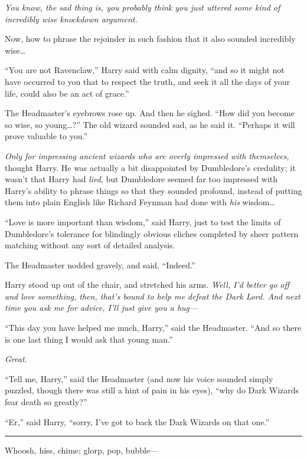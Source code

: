 \emph{You know, the sad thing is, you probably think you just uttered
some kind of incredibly wise knockdown argument.}

Now, how to phrase the rejoinder in such fashion that it also sounded
incredibly wise\ldots{}

``You are not Ravenclaw,'' Harry said with calm dignity, ``and so it
might not have occurred to you that to respect the truth, and seek it
all the days of your life, could also be an act of grace.''

The Headmaster's eyebrows rose up. And then he sighed. ``How did you
become so wise, so young\ldots{}?'' The old wizard sounded sad, as he
said it. ``Perhaps it will prove valuable to you.''

\emph{Only for impressing ancient wizards who are overly impressed with
themselves,} thought Harry. He was actually a bit disappointed by
Dumbledore's credulity; it wasn't that Harry had \emph{lied}, but
Dumbledore seemed far too impressed with Harry's ability to phrase
things so that they sounded profound, instead of putting them into plain
English like Richard Feynman had done with \emph{his} wisdom\ldots{}

``Love is more important than wisdom,'' said Harry, just to test the
limits of Dumbledore's tolerance for blindingly obvious cliches
completed by sheer pattern matching without any sort of detailed
analysis.

The Headmaster nodded gravely, and said, ``Indeed.''

Harry stood up out of the chair, and stretched his arms. \emph{Well, I'd
better go off and love something, then, that's bound to help me defeat
the Dark Lord. And next time you ask me for advice, I'll just give you a
hug---}

``This day you have helped me much, Harry,'' said the Headmaster. ``And
so there is one last thing I would ask that young man.''

\emph{Great.}

``Tell me, Harry,'' said the Headmaster (and now his voice sounded
simply puzzled, though there was still a hint of pain in his eyes),
``why do Dark Wizards fear death so greatly?''

``Er,'' said Harry, ``sorry, I've got to back the Dark Wizards on that
one.''

\begin{center}\rule{3in}{0.4pt}\end{center}

Whoosh, hiss, chime; glorp, pop, bubble---

